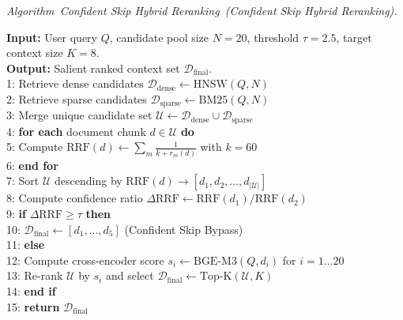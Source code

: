 \documentclass[10pt]{SPIIRAS_Proceedings}
\renewenvironment{algorithm}[1][\unskip]{%
  \refstepcounter{alg}%
  \vskip 6pt\noindent%
  {\slshape Algorithm~\thealg\ifx\relax#1\relax\else\ (#1)\fi.}%
  \par\nopagebreak\smallskip\upshape
}{\par\vskip 6pt}
\begin{document}
\begin{minipage}{\linewidth}
\begin{algorithm}[Confident Skip Hybrid Reranking]\label{alg:confident_skip}
\textbf{Input:} User query $Q$, candidate pool size $N=20$, threshold $\tau=2.5$, target context size $K=8$.\\
\textbf{Output:} Salient ranked context set $\mathcal{D}_{\text{final}}$.\\
1: Retrieve dense candidates $\mathcal{D}_{\text{dense}} \leftarrow \text{HNSW}(Q, N)$\\
2: Retrieve sparse candidates $\mathcal{D}_{\text{sparse}} \leftarrow \text{BM25}(Q, N)$\\
3: Merge unique candidate set $\mathcal{U} \leftarrow \mathcal{D}_{\text{dense}} \cup \mathcal{D}_{\text{sparse}}$\\
4: \textbf{for each} document chunk $d \in \mathcal{U}$ \textbf{do}\\
5: \quad Compute $\text{RRF}(d) \leftarrow \sum_{m} \frac{1}{k + r_m(d)}$ with $k=60$\\
6: \textbf{end for}\\
7: Sort $\mathcal{U}$ descending by $\text{RRF}(d) \rightarrow [d_1, d_2, \dots, d_{|\mathcal{U}|}]$\\
8: Compute confidence ratio $\Delta \text{RRF} \leftarrow \text{RRF}(d_1) / \text{RRF}(d_2)$\\
9: \textbf{if} $\Delta \text{RRF} \ge \tau$ \textbf{then}\\
10: \quad $\mathcal{D}_{\text{final}} \leftarrow [d_1, \dots, d_5]$ \quad (Confident Skip Bypass)\\
11: \textbf{else}\\
12: \quad Compute cross-encoder score $s_i \leftarrow \text{BGE-M3}(Q, d_i)$ for $i=1 \dots 20$\\
13: \quad Re-rank $\mathcal{U}$ by $s_i$ and select $\mathcal{D}_{\text{final}} \leftarrow \text{Top-K}(\mathcal{U}, K)$\\
14: \textbf{end if}\\
15: \textbf{return} $\mathcal{D}_{\text{final}}$
\end{algorithm}
\end{minipage}
\end{document}
